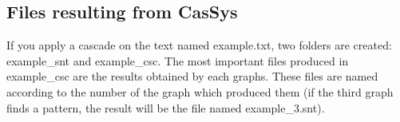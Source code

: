 \subsection{Files resulting from CasSys}

If you apply a cascade on the text named example.txt, two folders are created: example\_snt and example\_csc.
The most important files produced in example\_csc are the results obtained by each graphs. These files are named according to the number of the graph which produced them (if the third graph finds a pattern, the result will be the file named example\_3.snt).
